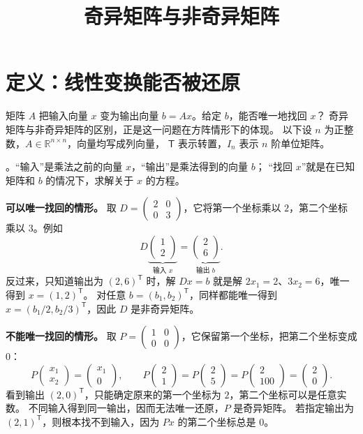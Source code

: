 \documentclass[UTF8,12pt,a4paper,fontset=fandol]{ctexart}
\title{奇异矩阵与非奇异矩阵}
\author{}
\date{}
\begin{document}
\maketitle

\section{定义：线性变换能否被还原}

矩阵 $A$ 把输入向量 $x$ 变为输出向量 $b=Ax$。给定 $b$，能否唯一地找回 $x$？
奇异矩阵与非奇异矩阵的区别，正是这一问题在方阵情形下的体现。
以下设 $n$ 为正整数，$A\in\mathbb R^{n\times n}$，向量均写成列向量，
$\mathsf T$ 表示转置，$I_n$ 表示 $n$ 阶单位矩阵。

\begin{inputoutputbox}
。“输入”是乘法之前的向量 $x$，“输出”是乘法得到的向量 $b$；
“找回 $x$”就是在已知矩阵和 $b$ 的情况下，求解关于 $x$ 的方程。

\textbf{可以唯一找回的情形。}
取 $D=\begin{pmatrix}2&0\\0&3\end{pmatrix}$，它将第一个坐标乘以 $2$，第二个坐标乘以 $3$。例如
\[
  D\underbrace{\begin{pmatrix}1\\2\end{pmatrix}}_{\text{输入 }x}
  =\underbrace{\begin{pmatrix}2\\6\end{pmatrix}}_{\text{输出 }b}.
\]
反过来，只知道输出为 $(2,6)^{\mathsf T}$ 时，解 $Dx=b$ 就是解
$2x_1=2$、$3x_2=6$，唯一得到 $x=(1,2)^{\mathsf T}$。
对任意 $b=(b_1,b_2)^{\mathsf T}$，同样都能唯一得到
$x=(b_1/2,b_2/3)^{\mathsf T}$，因此 $D$ 是非奇异矩阵。

\textbf{不能唯一找回的情形。}
取 $P=\begin{pmatrix}1&0\\0&0\end{pmatrix}$，它保留第一个坐标，把第二个坐标变成 $0$：
\[
  P\begin{pmatrix}x_1\\x_2\end{pmatrix}=\begin{pmatrix}x_1\\0\end{pmatrix},
  \qquad
  P\begin{pmatrix}2\\1\end{pmatrix}
  =P\begin{pmatrix}2\\5\end{pmatrix}
  =P\begin{pmatrix}2\\100\end{pmatrix}
  =\begin{pmatrix}2\\0\end{pmatrix}.
\]
看到输出 $(2,0)^{\mathsf T}$，只能确定原来的第一个坐标为 $2$，第二个坐标可以是任意实数。
不同输入得到同一输出，因而无法唯一还原，$P$ 是奇异矩阵。
若指定输出为 $(2,1)^{\mathsf T}$，则根本找不到输入，因为 $Px$ 的第二个坐标总是 $0$。


\end{inputoutputbox}
\end{document}
